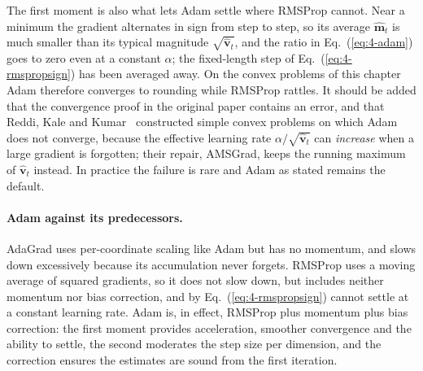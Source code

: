 The first moment is also what lets Adam settle where RMSProp cannot.  Near a
minimum the gradient alternates in sign from step to step, so its average
$\hat{\bm{m}}_t$ is much smaller than its typical magnitude
$\sqrt{\hat{\bm{v}}_t}$, and the ratio in Eq.~(\ref{eq:4-adam}) goes to zero
even at a constant $\alpha$; the fixed-length step of
Eq.~(\ref{eq:4-rmspropsign}) has been averaged away.  On the convex problems
of this chapter Adam therefore converges to rounding while RMSProp rattles.
It should be added that the convergence proof in the original paper contains
an error, and that Reddi, Kale and Kumar~\cite{reddi2018} constructed simple
convex problems on which Adam does not converge, because the effective
learning rate $\alpha/\sqrt{\hat{\bm{v}}_t}$ can \emph{increase} when a
large gradient is forgotten; their repair, AMSGrad, keeps the running
maximum of $\hat{\bm{v}}_t$ instead.  In practice the failure is rare and
Adam as stated remains the default.

\paragraph{Adam against its predecessors.}
AdaGrad uses per-coordinate scaling like Adam but has no momentum, and slows
down excessively because its accumulation never forgets.  RMSProp uses a
moving average of squared gradients, so it does not slow down, but includes
neither momentum nor bias correction, and by Eq.~(\ref{eq:4-rmspropsign})
cannot settle at a constant learning rate.  Adam is, in effect, RMSProp plus
momentum plus bias correction: the first moment provides acceleration,
smoother convergence and the ability to settle, the second moderates the step
size per dimension, and the correction ensures the estimates are sound from
the first iteration.

